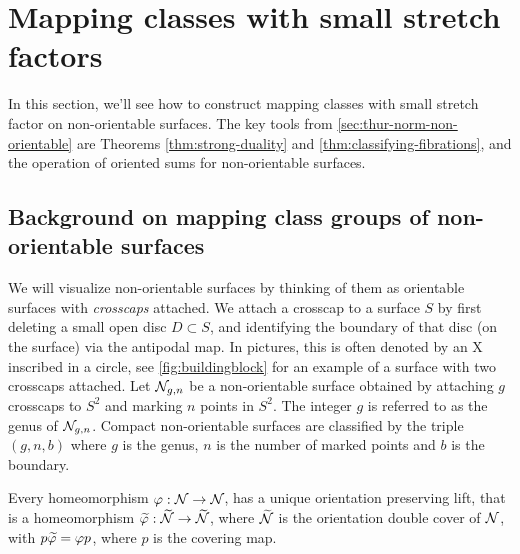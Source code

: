 \section{Mapping classes with small stretch factors}
\label{sec:mapping-classes-with}

In this section, we'll see how to construct mapping classes with small stretch factor on non-orientable surfaces.
The key tools from \autoref{sec:thur-norm-non-orientable} are Theorems \ref{thm:strong-duality} and \ref{thm:classifying-fibrations}, and the operation of oriented sums for non-orientable surfaces.

\subsection{Background on mapping class groups of non-orientable surfaces}
\label{sec:backgr-mapp-class}

We will visualize non-orientable surfaces by thinking of them as orientable surfaces with \emph{crosscaps} attached.
We attach a crosscap to a surface $S$ by first deleting a small open disc $D\subset S$, and identifying the boundary of that disc (on the surface) via the antipodal map.
In pictures, this is often denoted by an X inscribed in a circle, see \autoref{fig:buildingblock} for an example of a surface with two crosscaps attached.
Let $\mathcal{N}_{g,n}$ be a non-orientable surface obtained by attaching $g$ crosscaps to $S^2$ and marking $n$ points in $S^2$.
The integer $g$ is referred to as the genus of $\mathcal{N}_{g,n}$.
Compact non-orientable surfaces are classified by the triple $(g,n,b)$ where $g$ is the genus, $n$ is the number of marked points and $b$ is the boundary.

Every homeomorphism $\varphi: \mathcal{N} \to \mathcal{N}$, has a unique orientation preserving lift, that is a homeomorphism $\widetilde{\varphi}: \widetilde{\mathcal{N}} \to \widetilde{\mathcal{N}}$, where $\widetilde{\mathcal{N}}$ is the orientation double cover of $\mathcal{N}$, with $p\widetilde{\varphi}=\varphi p$, where $p$ is the covering map.

